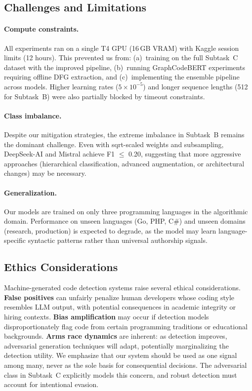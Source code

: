 \documentclass[11pt]{article}
\begin{document}
\subsection{Challenges and Limitations}

\paragraph{Compute constraints.} All experiments ran on a single T4 GPU (16\,GB VRAM) with Kaggle session limits (12 hours). This prevented us from: (a)~training on the full Subtask~C dataset with the improved pipeline, (b)~running GraphCodeBERT experiments requiring offline DFG extraction, and (c)~implementing the ensemble pipeline across models. Higher learning rates ($5{\times}10^{-5}$) and longer sequence lengths (512 for Subtask~B) were also partially blocked by timeout constraints.

\paragraph{Class imbalance.} Despite our mitigation strategies, the extreme imbalance in Subtask~B remains the dominant challenge. Even with sqrt-scaled weights and subsampling, DeepSeek-AI and Mistral achieve F1 $\leq$ 0.20, suggesting that more aggressive approaches (hierarchical classification, advanced augmentation, or architectural changes) may be necessary.

\paragraph{Generalization.} Our models are trained on only three programming languages in the algorithmic domain. Performance on unseen languages (Go, PHP, C\#) and unseen domains (research, production) is expected to degrade, as the model may learn language-specific syntactic patterns rather than universal authorship signals.

\subsection{Ethics Considerations}

Machine-generated code detection systems raise several ethical considerations. \textbf{False positives} can unfairly penalize human developers whose coding style resembles LLM output, with potential consequences in academic integrity or hiring contexts. \textbf{Bias amplification} may occur if detection models disproportionately flag code from certain programming traditions or educational backgrounds. \textbf{Arms race dynamics} are inherent: as detection improves, adversarial generation techniques will adapt, potentially marginalizing the detection utility. We emphasize that our system should be used as one signal among many, never as the sole basis for consequential decisions. The adversarial class in Subtask~C explicitly models this concern, and robust detection must account for intentional evasion.
\end{document}
